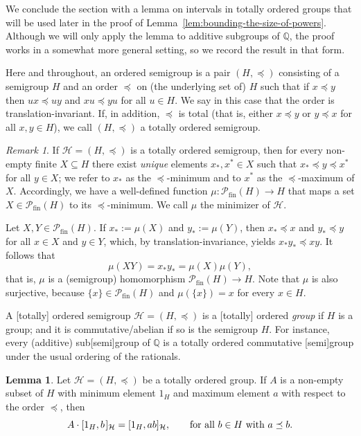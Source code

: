 \documentclass[11pt,reqno]{amsart}
\theoremstyle{definition}
\newtheorem{lemma}[theorem]{Lemma}
\theoremstyle{remark}
\newtheorem{remark}[theorem]{Remark}
\theoremstyle{theoremdd}
\newcommand{\evid}[1]{\textsf{#1}}
\newcommand{\fin}{\mathrm{fin}}
\renewcommand{\,}{\kern 0.1em}
\begin{document}
We conclude the section with a lemma on intervals in totally ordered groups that will be used later in the proof of Lemma~\ref{lem:bounding-the-size-of-powers}. Although we will only apply the lemma to additive subgroups of $\mathbb Q$, the proof works in a somewhat more general setting, so
we record the result in that form.

Here and throughout, an \evid{ordered semigroup} is a pair $(H,\preceq)$ consisting of a semigroup $H$ and an order $\preceq$ on (the underlying set of) $H$ such that if $x \preceq y$ then $ux \preceq uy$ and $xu \preceq yu$ for all $u \in H$.
We say in this case that the order is \evid{translation-invariant}. If,
in addition, $\preceq$ is \evid{total} (that is, either $x \preceq y$ or $y \preceq x$ for all $x, y \in H$), we call $(H,\preceq)$ a \evid{totally ordered semigroup}.



\begin{remark}
\label{rem:minimizer}
If $\mathcal H = (H, \preceq)$ is a totally ordered semigroup, then for every non-empty finite $X \subseteq H$ there exist \textit{unique} elements $x_\ast, x^\ast \in X$ such that $x_\ast \preceq y \preceq x^\ast$ for all $y \in X$; we refer to $x_\ast$ as the \evid{$\preceq$-minimum} and to $x^\ast$ as the \evid{$\preceq$-maximum} of $X$. 
Accordingly, we have a well-defined function $\mu \colon \mathcal P_\fin(H) \to H$ that maps a set $X \in \mathcal P_\fin(H)$ to its $\preceq$-minimum. We call $\mu$ the \evid{minimizer} of $\mathcal H$.

Let $X, Y \in \mathcal P_\fin(H)$. If $x_\ast := \mu(X)$ and $y_\ast := \mu(Y)$, then $x_\ast \preceq x$ and $y_\ast \preceq y$ for all $x \in X$ and $y \in Y$, which, by translation-invariance, yields $x_\ast y_\ast \preceq xy$. It follows
that 
\[
\mu(XY) = x_\ast y_\ast = \mu(X) \mu(Y),
\]
that is, $\mu$ is a (semigroup) homomorphism $\mathcal P_\fin(H) \to H$. Note that $\mu$ is also surjective, because $\{x\} \in \mathcal P_\fin(H)$ and $\mu(\{x\}) = x$ for every $x \in H$. 
\end{remark}

A [totally] ordered semigroup $\mathcal H = (H, \preceq)$ is a [totally] ordered \textit{group} if $H$ is a group; and it is commutative/abelian if so is the semigroup $H$. For instance, every (additive) sub[semi]group of $\mathbb Q$ is a totally ordered commutative [semi]group under the usual ordering of the rationals. 


\begin{lemma}
\label{lem:intervals}
Let $\mathcal H = (H, \preceq)$ be a totally ordered group. If $A$ is a non-empty subset of $H$ with minimum element $1_H$ and maximum element $a$ with respect to the order $\preceq$, then 
\[
A \cdot [1_H, b\,]_\mathcal{H} = [1_H, ab]_\mathcal{H},
\qquad\text{for all }
b \in H \text{ with } a \preceq b.
\]
\end{lemma}
\end{document}
